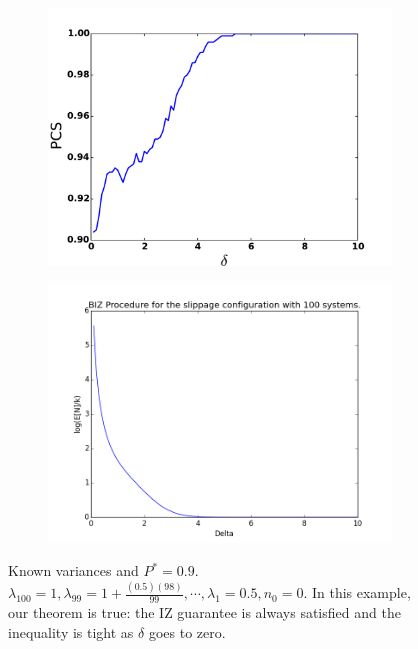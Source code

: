 \documentclass{wscpaperproc}
\theoremstyle{wsc}
\begin{document}
\begin{figure}
    \centering
    \begin{subfigure}[b]{0.4\textwidth}
        \centering
        \includegraphics[width=\textwidth]{plot5}
    \end{subfigure}
    \hfill
    \begin{subfigure}[b]{0.4\textwidth}
        \centering
        \includegraphics[width=\textwidth]{plot6}
    \end{subfigure}
    \caption{Known variances and $P^*=0.9$. $\lambda_{100}=1,\lambda_{99}=1+\frac{(0.5)(98)}{99},\cdots,\lambda_{1}=0.5,n_{0}=0$.
    In this example, our theorem is true: the IZ guarantee is always satisfied and the inequality is tight as $\delta$ goes to zero.
    \label{fig: tahi3}}
\end{figure}  
\end{document}
